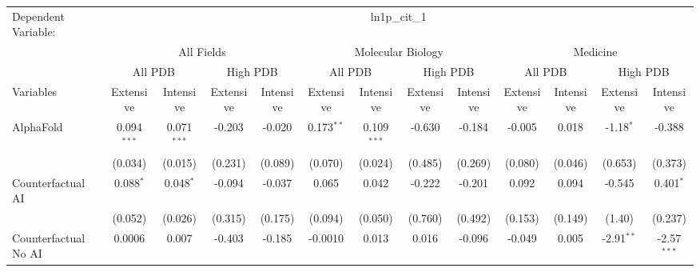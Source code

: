 \begingroup
\centering
\begin{tabular}{lcccccccccccc}
   \tabularnewline \midrule \midrule
   Dependent Variable: & \multicolumn{12}{c}{ln1p\_cit\_1}\\
 & \multicolumn{4}{c}{All Fields} & \multicolumn{4}{c}{Molecular Biology} & \multicolumn{4}{c}{Medicine} \\
\cmidrule(lr){2-5} \cmidrule(lr){6-9} \cmidrule(lr){10-13}
 & \multicolumn{2}{c}{All PDB} & \multicolumn{2}{c}{High PDB} & \multicolumn{2}{c}{All PDB} & \multicolumn{2}{c}{High PDB} & \multicolumn{2}{c}{All PDB} & \multicolumn{2}{c}{High PDB} \\
\cmidrule(lr){2-3} \cmidrule(lr){4-5} \cmidrule(lr){6-7} \cmidrule(lr){8-9} \cmidrule(lr){10-11} \cmidrule(lr){12-13}
Variables & \multicolumn{1}{c}{Extensive} & \multicolumn{1}{c}{Intensive} & \multicolumn{1}{c}{Extensive} & \multicolumn{1}{c}{Intensive} & \multicolumn{1}{c}{Extensive} & \multicolumn{1}{c}{Intensive} & \multicolumn{1}{c}{Extensive} & \multicolumn{1}{c}{Intensive} & \multicolumn{1}{c}{Extensive} & \multicolumn{1}{c}{Intensive} & \multicolumn{1}{c}{Extensive} & \multicolumn{1}{c}{Intensive} \\
\cmidrule(lr){1-1}\cmidrule(lr){2-2} \cmidrule(lr){3-3} \cmidrule(lr){4-4} \cmidrule(lr){5-5} \cmidrule(lr){6-6} \cmidrule(lr){7-7} \cmidrule(lr){8-8} \cmidrule(lr){9-9} \cmidrule(lr){10-10} \cmidrule(lr){11-11} \cmidrule(lr){12-12} \cmidrule(lr){13-13}
   AlphaFold                                & 0.094$^{***}$ & 0.071$^{***}$ & -0.203     & -0.020       & 0.173$^{**}$ & 0.109$^{***}$ & -0.630  & -0.184  & -0.005  & 0.018   & -1.18$^{*}$  & -0.388\\   
                                            & (0.034)       & (0.015)       & (0.231)    & (0.089)      & (0.070)      & (0.024)       & (0.485) & (0.269) & (0.080) & (0.046) & (0.653)      & (0.373)\\   
   Counterfactual AI                        & 0.088$^{*}$   & 0.048$^{*}$   & -0.094     & -0.037       & 0.065        & 0.042         & -0.222  & -0.201  & 0.092   & 0.094   & -0.545       & 0.401$^{*}$\\   
                                            & (0.052)       & (0.026)       & (0.315)    & (0.175)      & (0.094)      & (0.050)       & (0.760) & (0.492) & (0.153) & (0.149) & (1.40)       & (0.237)\\   
   Counterfactual No AI                     & 0.0006        & 0.007         & -0.403     & -0.185       & -0.0010      & 0.013         & 0.016   & -0.096  & -0.049  & 0.005   & -2.91$^{**}$ & -2.57$^{***}$\\   

\end{tabular}
